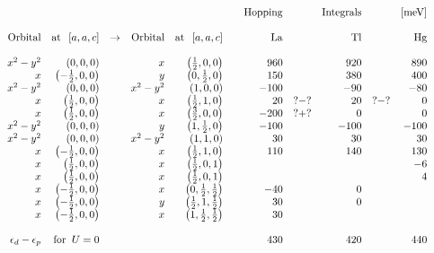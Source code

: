 \[
\begin{array}{rrrrrrrrrrrrr}
&  &  &  &  &  &  & {\rm Hopping} &  & {\rm Integrals} &  & \left[ {\rm meV}%
\right]  &  \\ 
&  &  &  &  &  &  &  &  &  &  &  &  \\ 
& {\rm Orbital} & {\rm at\;\;}\left[ a,a,c\right]  & \rightarrow  & {\rm %
Orbital} & {\rm at\;\;}\left[ a,a,c\right]  &  & {\rm La} &  & {\rm Tl} &  & 
{\rm Hg} &  \\ 
&  &  &  &  &  &  &  &  &  &  &  &  \\ 
& x^{2}-y^{2} & \left( 0,0,0\right)  &  & x & \left( \frac{1}{2},0,0\right) 
&  & 960 &  & 920 &  & 890 &  \\ 
& x & \left( -\frac{1}{2},0,0\right)  &  & y & \left( 0,\frac{1}{2},0\right) 
&  & 150 &  & 380 &  & 400 &  \\ 
& x^{2}-y^{2} & \left( 0,0,0\right)  &  & x^{2}-y^{2} & \left( 1,0,0\right) 
&  & -100 &  & -90 &  & -80 &  \\ 
& x & \left( \frac{1}{2},0,0\right)  &  & x & \left( \frac{1}{2},1,0\right) 
&  & 20 & ?-? & 20 & ?-? & 0 &  \\ 
& x & \left( \frac{1}{2},0,0\right)  &  & x & \left( \frac{3}{2},0,0\right) 
&  & -200 & ?+? & 0 &  & 0 &  \\ 
& x^{2}-y^{2} & \left( 0,0,0\right)  &  & y & \left( 1,\frac{1}{2},0\right) 
&  & -100 &  & -100 &  & -100 &  \\ 
& x^{2}-y^{2} & \left( 0,0,0\right)  &  & x^{2}-y^{2} & \left( 1,1,0\right) 
&  & 30 &  & 30 &  & 30 &  \\ 
& x & \left( -\frac{1}{2},0,0\right)  &  & x & \left( \frac{1}{2},1,0\right) 
&  & 110 &  & 140 &  & 130 &  \\ 
& x & \left( \frac{1}{2},0,0\right)  &  & x & \left( \frac{1}{2},0,1\right) 
&  &  &  &  &  & -6 &  \\ 
& x & \left( \frac{1}{2},0,0\right)  &  & x & \left( \frac{1}{2},0,1\right) 
&  &  &  &  &  & 4 &  \\ 
& x & \left( -\frac{1}{2},0,0\right)  &  & x & \left( 0,\frac{1}{2},\frac{1}{%
2}\right)  &  & -40 &  & 0 &  &  &  \\ 
& x & \left( -\frac{1}{2},0,0\right)  &  & y & \left( \frac{1}{2},1,\frac{1}{%
2}\right)  &  & 30 &  & 0 &  &  &  \\ 
& x & \left( -\frac{1}{2},0,0\right)  &  & x & \left( 1,\frac{1}{2},\frac{1}{%
2}\right)  &  & 30 &  &  &  &  &  \\ 
&  &  &  &  &  &  &  &  &  &  &  &  \\ 
& \epsilon _{d}-\epsilon _{p} & {\rm for\;\;}U=0 &  &  &  &  & 430 &  & 420
&  & 440 & 
\end{array}%
\]


